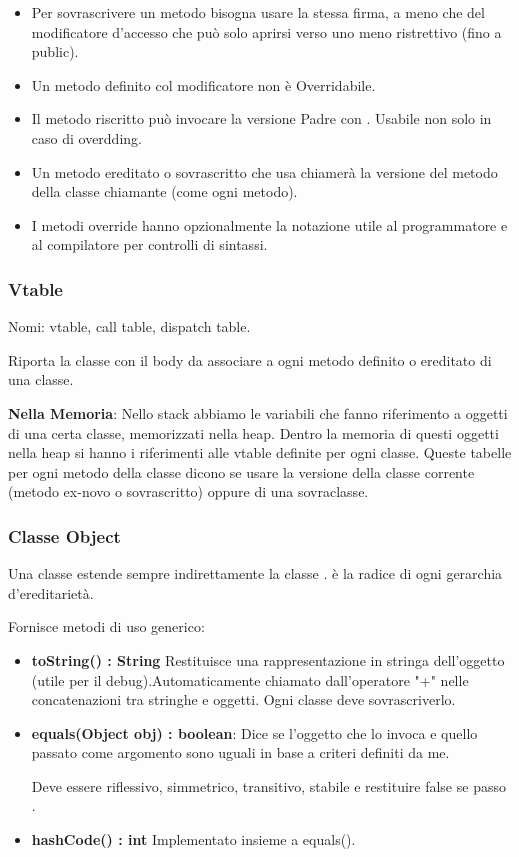 \begin{itemize}
	\item Per sovrascrivere un metodo bisogna usare la stessa firma, a meno che del modificatore d'accesso che può solo aprirsi verso uno meno ristrettivo (fino a public).

	\item Un metodo definito col modificatore  non è Overridabile.

	\item Il metodo riscritto può invocare la versione Padre con . Usabile non solo in caso di overdding.

	\item Un metodo ereditato o sovrascritto che usa  chiamerà la versione del metodo della classe chiamante (come ogni metodo).

	\item I metodi override hanno opzionalmente la notazione  utile al programmatore e al compilatore per controlli di sintassi.
\end{itemize}

\subsubsection{Vtable}
Nomi: vtable, call table, dispatch table.

Riporta la classe con il body da associare a ogni metodo definito o ereditato di una classe.

\textbf{Nella Memoria}: Nello stack abbiamo le variabili che fanno riferimento a oggetti di una certa classe, memorizzati nella heap. Dentro la memoria di questi oggetti nella heap si hanno i riferimenti alle vtable definite per ogni classe. Queste tabelle per ogni metodo della classe dicono se usare la versione della classe corrente (metodo ex-novo o sovrascritto) oppure di una sovraclasse.

\subsubsection{Classe Object}
Una classe estende sempre indirettamente la classe .
 è la radice di ogni gerarchia d'ereditarietà.

Fornisce metodi di uso generico:
\begin{itemize}
	\item \textbf{toString() : String} Restituisce una rappresentazione in stringa dell'oggetto (utile per il debug).Automaticamente chiamato dall'operatore "+" nelle concatenazioni tra stringhe e oggetti.
	Ogni classe deve sovrascriverlo.
	\item \textbf{equals(Object obj) : boolean}: Dice se l'oggetto che lo invoca e quello passato come argomento sono uguali in base a criteri definiti da me.

	Deve essere riflessivo, simmetrico, transitivo, stabile e restituire false se passo .
	\item \textbf{hashCode() : int} Implementato insieme a equals().
\end{itemize}

